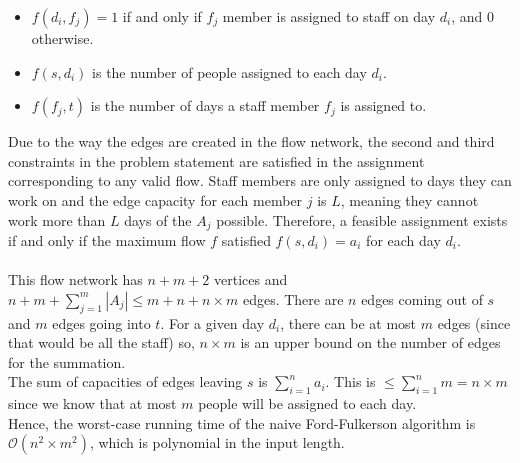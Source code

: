 \documentclass{article}
\begin{document}
\begin{enumerate}
\begin{enumerate}
\begin{itemize}
            \item $f(d_i, f_j) = 1$ if and only if $f_j$ member is assigned to staff on day $d_i$, and 0 otherwise.
            \item $f(s, d_i)$ is the number of people assigned to each day $d_i$.
            \item $f(f_j, t)$ is the number of days a staff member $f_j$ is assigned to.
        \end{itemize}
        Due to the way the edges are created in the flow network, the second and third constraints in the problem statement are satisfied in the assignment corresponding to any valid flow. Staff members are only assigned to days they can work on and the edge capacity for each member $j$ is $L$, meaning they cannot work more than $L$ days of the $A_j$ possible. Therefore, a feasible assignment exists if and only if the maximum flow $f$ satisfied $f(s, d_i) = a_i$ for each day $d_i$.\\
        \\
        This flow network has $n + m + 2$ vertices and $n + m + \sum^m_{j=1}|A_j| \leq m + n + n \times m$ edges. There are $n$ edges coming out of $s$ and $m$ edges going into $t$. For a given day $d_i$, there can be at most $m$ edges (since that would be all the staff) so, $n \times m$ is an upper bound on the number of edges for the summation.\\
        The sum of capacities of edges leaving $s$ is $\sum^n_{i=1} a_i$. This is $\leq \sum^n_{i=1} m = n \times m$ since we know that at most $m$ people will be assigned to each day.\\
        Hence, the worst-case running time of the naive Ford-Fulkerson algorithm is $\mathcal{O} (n^2 \times m^2)$, which is polynomial in the input length.
        

\end{enumerate}
\end{enumerate}
\end{document}
